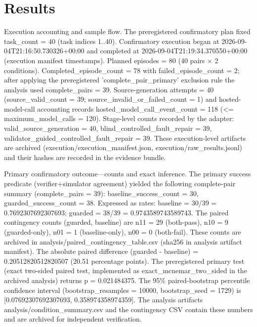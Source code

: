 \documentclass[conference]{IEEEtran}
\begin{document}
\section{Results}
Execution accounting and sample flow. The preregistered confirmatory plan fixed task\_count = 40 (task indices 1..40). Confirmatory execution began at 2026-09-04T21:16:50.730326+00:00 and completed at 2026-09-04T21:19:34.370550+00:00 (execution manifest timestamps). Planned episodes = 80 (40 pairs \ensuremath{\times} 2 conditions). Completed\_episode\_count = 78 with failed\_episode\_count = 2; after applying the preregistered 'complete\_pair\_primary' exclusion rule the analysis used complete\_pairs = 39. Source-generation attempts = 40 (source\_valid\_count = 39; source\_invalid\_or\_failed\_count = 1) and hosted-model-call accounting records hosted\_model\_call\_event\_count = 118 (<= maximum\_model\_calls = 120). Stage-level counts recorded by the adapter: valid\_source\_generation = 40, blind\_controlled\_fault\_repair = 39, validator\_guided\_controlled\_fault\_repair = 39. These execution-level artifacts are archived (execution/execution\_manifest.json, execution/raw\_results.jsonl) and their hashes are recorded in the evidence bundle.

Primary confirmatory outcome---counts and exact inference. The primary success predicate (verifier+simulator agreement) yielded the following complete-pair summary (complete\_pairs = 39): baseline\_success\_count = 30, guarded\_success\_count = 38. Expressed as rates: baseline = 30/39 = 0.7692307692307693; guarded = 38/39 = 0.9743589743589743. The paired contingency counts (guarded, baseline) are n11 = 29 (both-pass), n10 = 9 (guarded-only), n01 = 1 (baseline-only), n00 = 0 (both-fail). These counts are archived in analysis/paired\_contingency\_table.csv (sha256 in analysis artifact manifest). The absolute paired difference (guarded - baseline) = 0.20512820512820507 (20.51 percentage points). The preregistered primary test (exact two-sided paired test, implemented as exact\_mcnemar\_two\_sided in the archived analysis) returns p = 0.021484375. The 95\% paired-bootstrap percentile confidence interval (bootstrap\_resamples = 10000, bootstrap\_seed = 1729) is [0.07692307692307693, 0.358974358974359]. The analysis artifacts analysis/condition\_summary.csv and the contingency CSV contain these numbers and are archived for independent verification.
\end{document}
